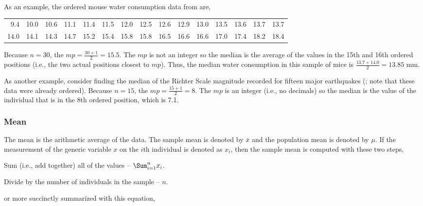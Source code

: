 \documentclass[10pt,openany]{book}\usepackage[]{graphicx}\usepackage[]{color}
\begin{document}
As an example, the ordered mouse water consumption data from  are,

\begin{tabular}{rrrrrrrrrrrrrrr}
  9.4 & 10.0 & 10.6 & 11.1 & 11.4 & 11.5 & 12.0 & 12.5 & 12.6 & 12.9 & 13.0 & 13.5 & 13.6 & 13.7 & 13.7 \\ 
  14.0 & 14.1 & 14.3 & 14.7 & 15.2 & 15.4 & 15.8 & 15.8 & 16.5 & 16.6 & 16.6 & 17.0 & 17.4 & 18.2 & 18.4 \\ 
  \end{tabular}


Because $n=30$, the $mp=\frac{30+1}{2}=15.5$.  The $mp$ is not an integer so the median is the average of the values in the 15th and 16th ordered positions (i.e., the two actual positions closest to $mp$).  Thus, the median water consumption in this sample of mice is $\frac{13.7+14.0}{2}=13.85$ mm.

As another example, consider finding the median of the Richter Scale magnitude recorded for fifteen major earthquakes (; note that these data were already ordered).  Because $n=15$, the $mp=\frac{15+1}{2}=8$.  The $mp$ is an integer (i.e., no decimals) so the median is the value of the individual that is in the 8th ordered position, which is 7.1.


\subsubsection{Mean}
The mean is the arithmetic average of the data.  The sample mean is denoted by $\bar{x}$ and the population mean is denoted by $\mu$.  If the measurement of the generic variable $x$ on the $i$th individual is denoted as $x_{i}$, then the sample mean is computed with these two steps,
\begin{Enumerate}
  \item Sum (i.e., add together) all of the values -- $\Sum_{i=1}^{n}x_{i}$.
  \item Divide by the number of individuals in the sample -- $n$.
\end{Enumerate}
or more succinctly summarized with this equation,
\end{document}
